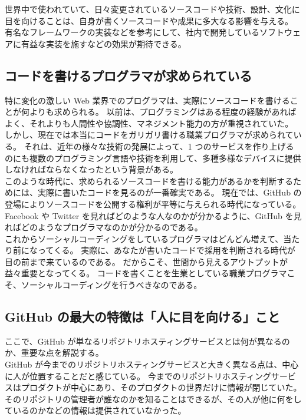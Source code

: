 世界中で使われていて、日々変更されているソースコードや技術、設計、文化に目を向けることは、自身が書くソースコードや成果に多大なる影響を与える。
有名なフレームワークの実装などを参考にして、社内で開発しているソフトウェアに有益な実装を施すなどの効果が期待できる。
\subsection{コードを書けるプログラマが求められている}
特に変化の激しい Web 業界でのプログラマは、実際にソースコードを書けることが何よりも求められる。
以前は、プログラミングはある程度の経験があればよく、それよりも人間性や協調性、マネジメント能力の方が重視されていた。
しかし、現在では本当にコードをガリガリ書ける職業プログラマが求められている。
それは、近年の様々な技術の発展によって、1 つのサービスを作り上げるのにも複数のプログラミング言語や技術を利用して、多種多様なデバイスに提供しなければならなくなったという背景がある。\\

このような時代に、求められるソースコードを書ける能力があるかを判断するためには、実際に書いたコードを見るのが一番確実である。
現在では、GitHub の登場によりソースコードを公開する権利が平等に与えられる時代になっている。
Facebook や Twitter を見ればどのような人なのかが分かるように、GitHub を見ればどのようなプログラマなのかが分かるのである。\\

これからソーシャルコーディングをしているプログラマはどんどん増えて、当たり前になってくる。
実際に、あなたが書いたコードで採用を判断される時代が目の前まで来ているのである。
だからこそ、世間から見えるアウトプットが益々重要となってくる。
コードを書くことを生業としている職業プログラマこそ、ソーシャルコーディングを行うべきなのである。
\subsection{GitHub の最大の特徴は「人に目を向ける」こと}
ここで、GitHub が単なるリポジトリホスティングサービスとは何が異なるのか、重要な点を解説する。\\

GitHub が今までのリポジトリホスティングサービスと大きく異なる点は、中心に人が位置することだと感じている。
今までのリポジトリホスティングサービスはプロダクトが中心にあり、そのプロダクトの世界だけに情報が閉じていた。
そのリポジトリの管理者が誰なのかを知ることはできるが、その人が他に何をしているのかなどの情報は提供されていなかった。\\

